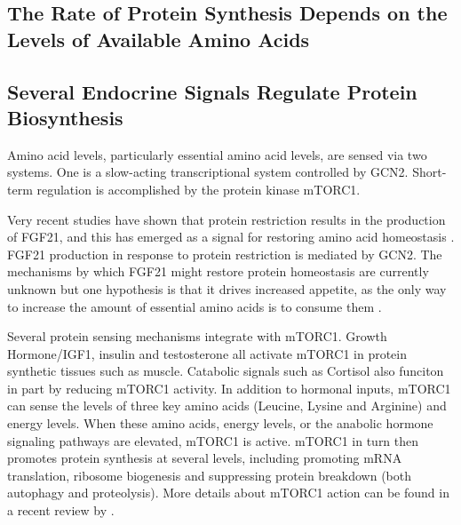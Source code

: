 \documentclass{tufte-handout}
\begin{document}
\subsection{The Rate of Protein Synthesis Depends on the Levels of Available Amino Acids}

\subsection{Several Endocrine Signals Regulate Protein Biosynthesis}

Amino acid levels, particularly essential amino acid levels, are sensed via two systems.  One is a slow-acting transcriptional system controlled by GCN2.  Short-term regulation is accomplished by the protein kinase mTORC1.


  Very recent studies have shown that protein restriction results in the production of FGF21, and this has emerged as a signal for restoring amino acid homeostasis \citep{Laeger2014}.  FGF21 production in response to protein restriction is mediated by GCN2.  The mechanisms by which FGF21 might restore protein homeostasis are currently unknown but one hypothesis is that it drives increased appetite, as the only way to increase the amount of essential amino acids is to consume them \citep{Solon-Biet2016a}.

  Several protein sensing mechanisms integrate with mTORC1.  Growth Hormone/IGF1, insulin and testosterone all activate mTORC1 in protein synthetic tissues such as muscle.  Catabolic signals such as Cortisol also funciton in part by reducing mTORC1 activity.  In addition to hormonal inputs, mTORC1 can sense the levels of three key amino acids (Leucine, Lysine and Arginine) and energy levels.  When these amino acids, energy levels, or the anabolic hormone signaling pathways are elevated, mTORC1 is active.  mTORC1 in turn then promotes protein synthesis at several levels, including promoting mRNA translation, ribosome biogenesis and suppressing protein breakdown (both autophagy and proteolysis).  More details about mTORC1 action can be found in a recent review by \citet{Saxton2017}.
\end{document}

